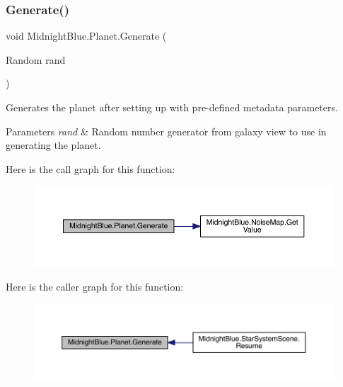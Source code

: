 \subsubsection{\texorpdfstring{Generate()}{Generate()}}
{\footnotesize\ttfamily void Midnight\+Blue.\+Planet.\+Generate (\begin{DoxyParamCaption}\item[{Random}]{rand }\end{DoxyParamCaption})\hspace{0.3cm}{\ttfamily [inline]}}



Generates the planet after setting up with pre-\/defined metadata parameters. 


\begin{DoxyParams}{Parameters}
{\em rand} & Random number generator from galaxy view to use in generating the planet.\\
\hline
\end{DoxyParams}
Here is the call graph for this function\+:
\nopagebreak
\begin{figure}[H]
\begin{center}
\leavevmode
\includegraphics[width=350pt]{class_midnight_blue_1_1_planet_ac7264aea3a992afb4cab0ad99c96dbb8_cgraph}
\end{center}
\end{figure}
Here is the caller graph for this function\+:
\nopagebreak
\begin{figure}[H]
\begin{center}
\leavevmode
\includegraphics[width=350pt]{class_midnight_blue_1_1_planet_ac7264aea3a992afb4cab0ad99c96dbb8_icgraph}
\end{center}
\end{figure}
\hypertarget{class_midnight_blue_1_1_planet_ac3b3442ad8f168a8d9151386592eb270}{}\label{class_midnight_blue_1_1_planet_ac3b3442ad8f168a8d9151386592eb270} 
